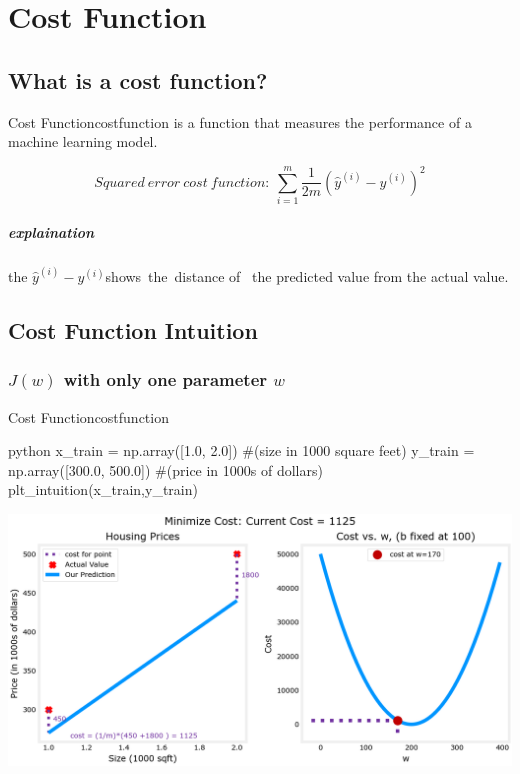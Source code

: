 \chapter{Cost Function}
\section{What is a cost function?}

\begin{dfnbox}{Cost Function}{costfunction}
     is a function that measures the %
    performance of a machine learning model.\par 
    \begin{equation}
        Squared\ error\ cost\ function:\ \sum_{i=1}^{m}\frac{1}{2m}\left(\hat{y}^{(i)}-y^{(i)}\right)^2
    \end{equation} 
\end{dfnbox}

\paragraph*{explaination}
the $\hat{y}^{(i)} - y^{(i)}$shows\ the\ distance of\ %
the predicted value from the actual value.

\section{Cost Function Intuition}
\subsection*{$J(w)$ with only one parameter $w$}
\begin{codebox}{Cost Function}{costfunction}
    \begin{amzcode}{python}
        x_train = np.array([1.0, 2.0])          #(size in 1000 square feet)
        y_train = np.array([300.0, 500.0])      #(price in 1000s of dollars)
        plt_intuition(x_train,y_train)    
    \end{amzcode}
\end{codebox}
\includegraphics[width=\textwidth]{images/2.2_1}

